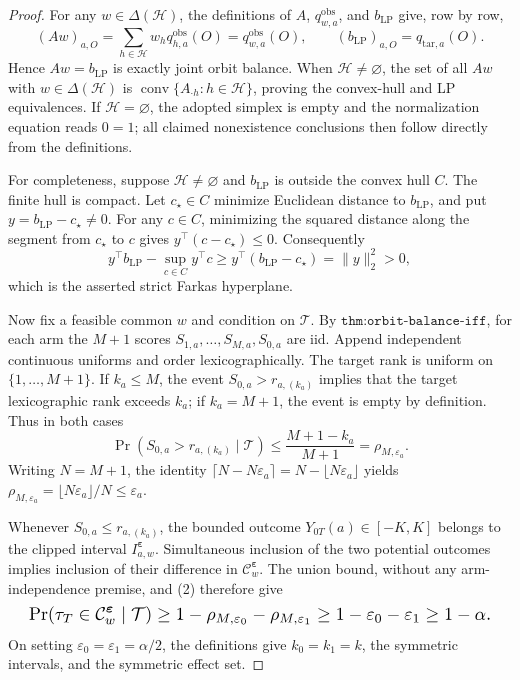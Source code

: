 \documentclass{article}
\begin{document}
\begin{proof}
For any \(w\in\Delta(\mathcal H)\), the definitions of \(A\), \(q^{\mathrm{obs}}_{w,a}\), and \(b_{\mathrm{LP}}\) give, row by row,
\[
(Aw)_{a,O}=\sum_{h\in\mathcal H}w_hq^{\mathrm{obs}}_{h,a}(O)=q^{\mathrm{obs}}_{w,a}(O),\qquad (b_{\mathrm{LP}})_{a,O}=q_{\mathrm{tar},a}(O).
\tag{1}
\]
Hence \(Aw=b_{\mathrm{LP}}\) is exactly joint orbit balance. When \(\mathcal H\ne\varnothing\), the set of all \(Aw\) with \(w\in\Delta(\mathcal H)\) is \(\operatorname{conv}\{A_{\cdot h}:h\in\mathcal H\}\), proving the convex-hull and LP equivalences. If \(\mathcal H=\varnothing\), the adopted simplex is empty and the normalization equation reads \(0=1\); all claimed nonexistence conclusions then follow directly from the definitions.

For completeness, suppose \(\mathcal H\ne\varnothing\) and \(b_{\mathrm{LP}}\) is outside the convex hull \(C\). The finite hull is compact. Let \(c_\star\in C\) minimize Euclidean distance to \(b_{\mathrm{LP}}\), and put \(y=b_{\mathrm{LP}}-c_\star\ne0\). For any \(c\in C\), minimizing the squared distance along the segment from \(c_\star\) to \(c\) gives \(y^\top(c-c_\star)\le0\). Consequently
\[
y^\top b_{\mathrm{LP}}-\sup_{c\in C}y^\top c\ge y^\top(b_{\mathrm{LP}}-c_\star)=\lVert y\rVert_2^2>0,
\]
which is the asserted strict Farkas hyperplane.

Now fix a feasible common \(w\) and condition on \(\mathcal T\). By \(\texttt{thm:orbit-balance-iff}\), for each arm the \(M+1\) scores \(S_{1,a},\ldots,S_{M,a},S_{0,a}\) are iid. Append independent continuous uniforms and order lexicographically. The target rank is uniform on \(\{1,\ldots,M+1\}\). If \(k_a\le M\), the event \(S_{0,a}>r_{a,(k_a)}\) implies that the target lexicographic rank exceeds \(k_a\); if \(k_a=M+1\), the event is empty by definition. Thus in both cases
\[
\Pr(S_{0,a}>r_{a,(k_a)}\mid\mathcal T)\le\frac{M+1-k_a}{M+1}=\rho_{M,\varepsilon_a}.
\tag{2}
\]
Writing \(N=M+1\), the identity \(\lceil N-N\varepsilon_a\rceil=N-\lfloor N\varepsilon_a\rfloor\) yields \(\rho_{M,\varepsilon_a}=\lfloor N\varepsilon_a\rfloor/N\le\varepsilon_a\).

Whenever \(S_{0,a}\le r_{a,(k_a)}\), the bounded outcome \(Y_{0T}(a)\in[-K,K]\) belongs to the clipped interval \(I^{\boldsymbol\varepsilon}_{a,w}\). Simultaneous inclusion of the two potential outcomes implies inclusion of their difference in \(\mathcal C^{\boldsymbol\varepsilon}_w\). The union bound, without any arm-independence premise, and (2) therefore give
\[
\makebox[\linewidth][c]{\resizebox{0.98\linewidth}{!}{\par\noindent \makebox[\linewidth][c]{\resizebox{0.98\linewidth}{!}{\(\displaystyle \displaystyle \Pr(\tau_T\in\mathcal C^{\boldsymbol\varepsilon}_w\mid\mathcal T)\ge1-\rho_{M,\varepsilon_0}-\rho_{M,\varepsilon_1}\ge1-\varepsilon_0-\varepsilon_1\ge1-\alpha.\)}}\par\noindent}}
\]
On setting \(\varepsilon_0=\varepsilon_1=\alpha/2\), the definitions give \(k_0=k_1=k\), the symmetric intervals, and the symmetric effect set.
\end{proof}
\end{document}
